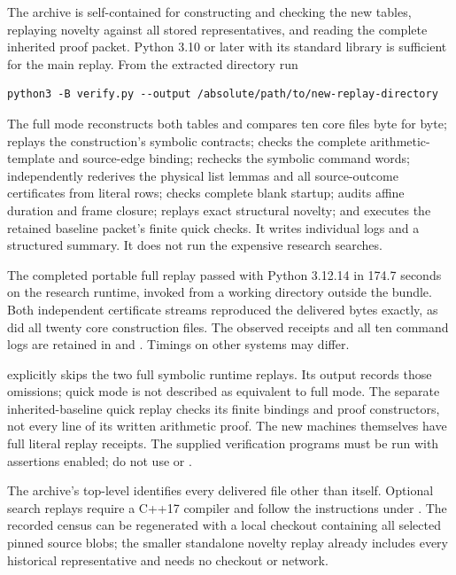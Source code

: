 \documentclass[10pt,a4paper]{article}
\begin{document}
The archive is self-contained for constructing and checking the new
tables, replaying novelty against all stored representatives, and
reading the complete inherited proof packet. Python 3.10 or later
with its standard library is sufficient for the main replay.
From the extracted directory run
\begin{verbatim}
python3 -B verify.py --output /absolute/path/to/new-replay-directory
\end{verbatim}
The full mode reconstructs both tables and compares ten core files
byte for byte; replays the construction's symbolic contracts; checks
the complete arithmetic-template and source-edge binding; rechecks
the symbolic command words; independently rederives the physical
list lemmas and all source-outcome certificates from literal rows;
checks complete blank startup; audits affine duration and frame
closure; replays exact structural novelty; and executes the retained
baseline packet's finite quick checks. It writes individual logs and
a structured summary. It does not run the expensive research searches.

The completed portable full replay passed with Python 3.12.14 in
174.7 seconds on the research runtime, invoked from a working directory
outside the bundle. Both independent certificate streams reproduced
the delivered bytes exactly, as did all twenty core construction files.
The observed receipts and all ten command logs are retained in
 and
. Timings on other systems may differ.

 explicitly skips the two full symbolic runtime
replays. Its output records those omissions; quick mode is not described
as equivalent to full mode. The separate inherited-baseline quick replay
checks its finite bindings and proof constructors, not every line of
its written arithmetic proof. The new machines themselves have full
literal replay receipts. The supplied verification programs must be
run with assertions enabled; do not use  or
.

The archive's top-level  identifies every delivered
file other than itself. Optional search replays require a C++17
compiler and follow the instructions under . The
recorded census can be regenerated with a local checkout containing
all selected pinned source blobs; the smaller standalone novelty
replay already includes every historical representative and needs
no checkout or network.
\end{document}
